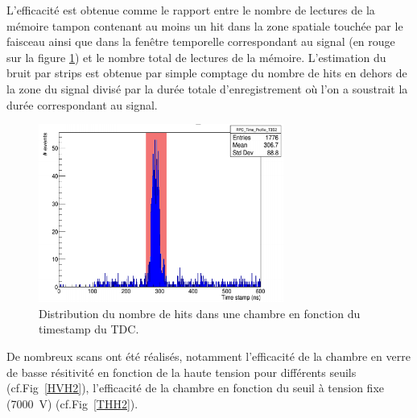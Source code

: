 L'efficacité est obtenue comme le rapport entre le nombre de lectures de la mémoire tampon contenant au moins un hit dans la zone spatiale touchée par le faisceau ainsi que dans la fenêtre temporelle correspondant au signal (en rouge sur la figure \ref{struch2}) et le nombre total de lectures de la mémoire. L'estimation du bruit par strips est obtenue par simple comptage du nombre de hits en dehors de la zone du signal divisé par la durée totale d'enregistrement où l'on a soustrait la durée correspondant au signal.

\begin{figure}[!ht]
	\centering
	\includegraphics[width=0.72\textwidth]{GLA/STRUCH2.png}
	\caption{Distribution du nombre de hits dans une chambre en fonction du timestamp du TDC.}
	\label{struch2}
\end{figure}

De nombreux scans ont été réalisés, notamment l'efficacité de la chambre en verre de basse résitivité en fonction de la haute tension pour différents seuils (cf.Fig~\ref{HVH2}), l'efficacité de la chambre en fonction du seuil à tension fixe (\SI{7000}{\volt}) (cf.Fig~\ref{THH2}).

